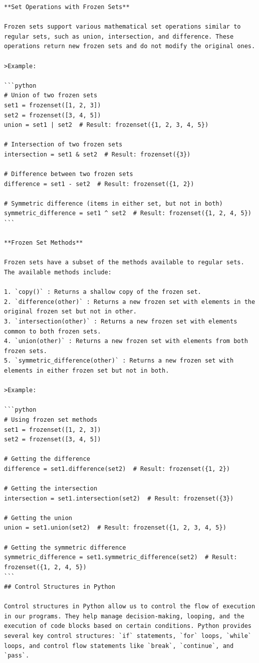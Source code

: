 \documentclass[
  letterpaper,
  DIV=11,
  numbers=noendperiod]{scrreprt}
\theoremstyle{plain}
\theoremstyle{definition}
\theoremstyle{remark}
\begin{document}
\begin{verbatim}
**Set Operations with Frozen Sets**

Frozen sets support various mathematical set operations similar to regular sets, such as union, intersection, and difference. These operations return new frozen sets and do not modify the original ones.

>Example:

```python
# Union of two frozen sets
set1 = frozenset([1, 2, 3])
set2 = frozenset([3, 4, 5])
union = set1 | set2  # Result: frozenset({1, 2, 3, 4, 5})

# Intersection of two frozen sets
intersection = set1 & set2  # Result: frozenset({3})

# Difference between two frozen sets
difference = set1 - set2  # Result: frozenset({1, 2})

# Symmetric difference (items in either set, but not in both)
symmetric_difference = set1 ^ set2  # Result: frozenset({1, 2, 4, 5})
```

**Frozen Set Methods**

Frozen sets have a subset of the methods available to regular sets. The available methods include:

1. `copy()` : Returns a shallow copy of the frozen set.
2. `difference(other)` : Returns a new frozen set with elements in the original frozen set but not in other.
3. `intersection(other)` : Returns a new frozen set with elements common to both frozen sets.
4. `union(other)` : Returns a new frozen set with elements from both frozen sets.
5. `symmetric_difference(other)` : Returns a new frozen set with elements in either frozen set but not in both.

>Example:

```python
# Using frozen set methods
set1 = frozenset([1, 2, 3])
set2 = frozenset([3, 4, 5])

# Getting the difference
difference = set1.difference(set2)  # Result: frozenset({1, 2})

# Getting the intersection
intersection = set1.intersection(set2)  # Result: frozenset({3})

# Getting the union
union = set1.union(set2)  # Result: frozenset({1, 2, 3, 4, 5})

# Getting the symmetric difference
symmetric_difference = set1.symmetric_difference(set2)  # Result: frozenset({1, 2, 4, 5})
```
## Control Structures in Python

Control structures in Python allow us to control the flow of execution in our programs. They help manage decision-making, looping, and the execution of code blocks based on certain conditions. Python provides several key control structures: `if` statements, `for` loops, `while` loops, and control flow statements like `break`, `continue`, and `pass`.


\end{verbatim}
\end{document}
